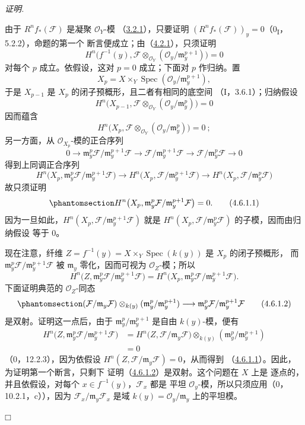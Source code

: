\documentclass[UTF8,fontset=none,11pt,oneside,openany]{ctexbook}
\providecommand{\square}{\mdlgwhtsquare}
\newenvironment{proof}{%
  \par\smallskip\noindent\textit{证明.}\ %
}{\hfill$\square$\par}
\newcommand{\oldpage}[2][]{%
  \hypertarget{ega-source-page-#1-#2}{}%
  \marginnote{\scriptsize\textbf{#1}~|~#2}\ignorespaces}
\let\EGAOriginalLabel\label
\renewcommand{\label}[1]{\phantomsection\EGAOriginalLabel{#1}}
\begin{document}
\begin{proof}
由于 $R^nf_*(\mathcal F)$ 是凝聚 $\mathcal O_Y$-模
（\hyperref[III.3.2.1-fr]{3.2.1}），只要证明
$(R^nf_*(\mathcal F))_y=0$（0\textsubscript{I}，5.2.2），命题的第一个
断言便成立；由（\hyperref[III.4.2.1-fr]{4.2.1}），只须证明
\[
H^n\bigl(f^{-1}(y),\mathcal F\otimes_{\mathcal O_Y}
(\mathcal O_y/\mathfrak m_y^{p+1})\bigr)=0
\]
对每个 $p$ 成立。依假设，这对 $p=0$ 成立；下面对 $p$ 作归纳。置
\[
X_p=X\times_Y\operatorname{Spec}
(\mathcal O_y/\mathfrak m_y^{p+1}),
\]
于是 $X_{p-1}$ 是 $X_p$ 的闭子预概形，且二者有相同的底空间
（I，3.6.1）；归纳假设
\[
H^n\bigl(X_{p-1},\mathcal F\otimes_{\mathcal O_Y}
(\mathcal O_y/\mathfrak m_y^p)\bigr)=0
\]
因而蕴含
\[
H^n\bigl(X_p,\mathcal F\otimes_{\mathcal O_Y}
(\mathcal O_y/\mathfrak m_y^p)\bigr)=0~;
\]
另一方面，从 $\mathcal O_{X_p}$-模的正合序列
\[
0\longrightarrow
\mathfrak m_y^p\mathcal F/\mathfrak m_y^{p+1}\mathcal F
\longrightarrow
\mathcal F/\mathfrak m_y^{p+1}\mathcal F
\longrightarrow
\mathcal F/\mathfrak m_y^p\mathcal F
\longrightarrow0
\]
得到上同调正合序列
\[
H^n\bigl(X_p,
\mathfrak m_y^p\mathcal F/\mathfrak m_y^{p+1}\mathcal F\bigr)
\longrightarrow
H^n\bigl(X_p,\mathcal F/\mathfrak m_y^{p+1}\mathcal F\bigr)
\longrightarrow
H^n\bigl(X_p,\mathcal F/\mathfrak m_y^p\mathcal F\bigr)
\]
故只须证明
\[
\label{III.4.6.1.1-fr}
H^n\bigl(X_p,
\mathfrak m_y^p\mathcal F/\mathfrak m_y^{p+1}\mathcal F\bigr)=0.
\tag{4.6.1.1}
\]
因为一旦如此，$H^n(X_p,\mathcal F/\mathfrak m_y^{p+1}\mathcal F)$ 就是
$H^n(X_p,\mathcal F/\mathfrak m_y^p\mathcal F)$ 的子模，因而由归纳假设
等于 $0$。

\oldpage[III]{140}

现在注意，纤维
$Z=f^{-1}(y)=X\times_Y\operatorname{Spec}(k(y))$ 是 $X_p$ 的闭子预概形，
而 $\mathfrak m_y^p\mathcal F/\mathfrak m_y^{p+1}\mathcal F$ 被
$\mathfrak m_y$ 零化，因而可视为 $\mathcal O_Z$-模；所以
\[
H^n\bigl(Z,\mathfrak m_y^p\mathcal F/
\mathfrak m_y^{p+1}\mathcal F\bigr)
=H^n\bigl(X_p,\mathfrak m_y^p\mathcal F/
\mathfrak m_y^{p+1}\mathcal F\bigr).
\]
下面证明典范的 $\mathcal O_Z$-同态
\[
\label{III.4.6.1.2-fr}
(\mathcal F/\mathfrak m_y\mathcal F)
\otimes_{k(y)}(\mathfrak m_y^p/\mathfrak m_y^{p+1})
\longrightarrow
\mathfrak m_y^p\mathcal F/\mathfrak m_y^{p+1}\mathcal F
\tag{4.6.1.2}
\]
是双射。证明这一点后，由于
$\mathfrak m_y^p/\mathfrak m_y^{p+1}$ 是自由 $k(y)$-模，便有
\[
\begin{split}
H^n\bigl(Z,\mathfrak m_y^p\mathcal F/
\mathfrak m_y^{p+1}\mathcal F\bigr)
&=H^n\bigl(Z,\mathcal F/\mathfrak m_y\mathcal F\bigr)
\otimes_{k(y)}(\mathfrak m_y^p/\mathfrak m_y^{p+1})\\
&=0
\end{split}
\]
（0，12.2.3），因为依假设
$H^n(Z,\mathcal F/\mathfrak m_y\mathcal F)=0$，从而得到
（\hyperref[III.4.6.1.1-fr]{4.6.1.1}）。因此，为证明第一个断言，只剩下
证明（\hyperref[III.4.6.1.2-fr]{4.6.1.2}）是双射。这个问题在 $X$ 上是
逐点的，并且依假设，对每个 $x\in f^{-1}(y)$，$\mathcal F_x$ 都是
平坦 $\mathcal O_y$-模，所以只须应用（0，10.2.1，c）），因为
$\mathcal F_x/\mathfrak m_y\mathcal F_x$ 是域
$k(y)=\mathcal O_y/\mathfrak m_y$ 上的平坦模。


\end{proof}
\end{document}
